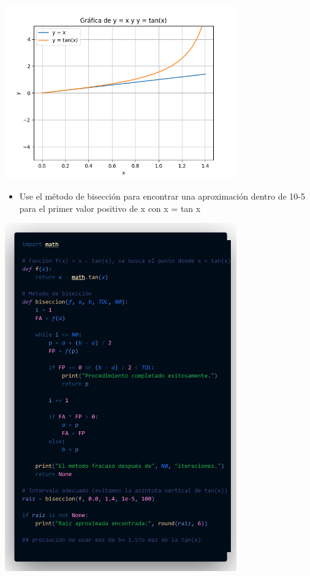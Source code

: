 \documentclass[12pt]{article}
\begin{document}
\vspace{0.5cm}

\begin{minipage}{0.75\textwidth}
    \raggedleft
    \includegraphics[width=0.75\textwidth]{inFiles/Figures/Graf_2.png}
\end{minipage}

\vspace{0.5cm}

\begin{itemize}
    \item {Use el método de bisección para encontrar una aproximación dentro de 10-5 para el primer valor positivo
    de x con x = tan x}
    \end{itemize}

\begin{minipage}{0.75\textwidth}
    \raggedleft
    \includegraphics[width=0.75\textwidth]{inFiles/Figures/cd5.png}
\end{minipage}
\end{document}
